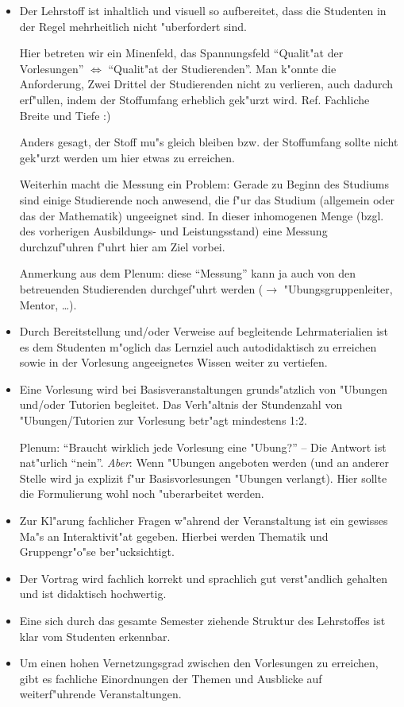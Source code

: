 \begin{itemize}
	\item Der Lehrstoff ist inhaltlich und visuell so aufbereitet, dass die Studenten 
	in der Regel mehrheitlich nicht "uberfordert sind.
\begin{kcmt}\begin{komacmt}
	Hier betreten wir ein Minenfeld, das Spannungsfeld "`Qualit"at der Vorlesungen"' $\Leftrightarrow$ "`Qualit"at
	der Studierenden"'. Man k"onnte die Anforderung, Zwei Drittel der Studierenden nicht zu verlieren, auch
	dadurch erf"ullen, indem der Stoffumfang erheblich gek"urzt wird. Ref. Fachliche Breite und Tiefe :)

	Anders gesagt, der Stoff mu"s gleich bleiben bzw. der Stoffumfang sollte nicht gek"urzt werden
	um hier etwas zu erreichen.

	Weiterhin macht die Messung ein Problem: Gerade zu Beginn des Studiums sind einige Studierende
	noch anwesend, die f"ur das Studium (allgemein oder das der Mathematik) ungeeignet sind. In dieser
	inhomogenen Menge (bzgl. des vorherigen Ausbildungs- und Leistungsstand) eine Messung durchzuf"uhren
	f"uhrt hier am Ziel vorbei.

	Anmerkung aus dem Plenum: diese "`Messung"' kann ja auch von den betreuenden Studierenden
	durchgef"uhrt werden ($\rightarrow$ "Ubungsgruppenleiter, Mentor, \dots).
\end{komacmt}\end{kcmt}
	\item Durch Bereitstellung und/oder Verweise auf begleitende Lehrmaterialien ist es dem Studenten
		m"oglich das Lernziel auch autodidaktisch zu erreichen sowie in der Vorlesung angeeignetes Wissen weiter zu
		vertiefen.
	\item Eine Vorlesung wird bei Basisveranstaltungen grunds"atzlich von "Ubungen und/oder Tutorien begleitet. Das Verh"altnis der Stundenzahl von "Ubungen/Tutorien zur Vorlesung betr"agt mindestens 1:2.
\begin{kcmt}\begin{komacmt}
	Plenum: "`Braucht wirklich jede Vorlesung eine "Ubung?"' -- Die Antwort ist nat"urlich "`nein"'.
	\emph{Aber}: Wenn "Ubungen angeboten werden (und an anderer Stelle wird ja explizit f"ur Basisvorlesungen
	"Ubungen verlangt). Hier sollte die Formulierung wohl noch "uberarbeitet werden.
\end{komacmt}\end{kcmt}
	\item Zur Kl"arung fachlicher Fragen w"ahrend der Veranstaltung ist ein gewisses Ma"s an Interaktivit"at gegeben. Hierbei werden Thematik und Gruppengr"o"se ber"ucksichtigt. 
	\item Der Vortrag wird fachlich korrekt und sprachlich gut verst"andlich gehalten und ist didaktisch hochwertig.
	\item Eine sich durch das gesamte Semester ziehende Struktur des Lehrstoffes ist klar vom Studenten erkennbar.
	\item Um einen hohen Vernetzungsgrad zwischen den Vorlesungen zu erreichen, gibt es fachliche Einordnungen der Themen und Ausblicke auf weiterf"uhrende Veranstaltungen. 
\end{itemize}

